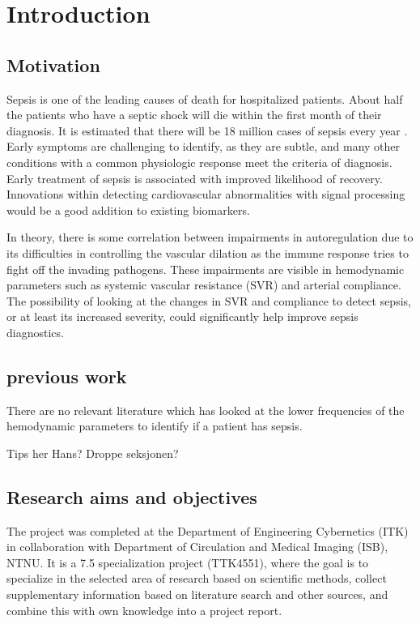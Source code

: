 
\chapter{Introduction}

\section{Motivation}
Sepsis is one of the leading causes of death for hospitalized patients. About half the patients who have a septic shock will die within the first month of their diagnosis.\cite{RN2} It is estimated that there will be 18 million cases of sepsis every year \cite{RN1}. Early symptoms are challenging to identify, as they are subtle, and many other conditions with a common physiologic response meet the criteria of diagnosis. Early treatment of sepsis is associated with improved likelihood of recovery. \cite{RN21} Innovations within detecting cardiovascular abnormalities with signal processing would be a good addition to existing biomarkers. 

In theory, there is some correlation between impairments in autoregulation due to its difficulties in controlling the vascular dilation as the immune response tries to fight off the invading pathogens. These impairments are visible in hemodynamic parameters such as systemic vascular resistance (SVR) and arterial compliance. The possibility of looking at the changes in SVR and compliance to detect sepsis, or at least its increased severity, could significantly help improve sepsis diagnostics.

\section{previous work}

There are no relevant literature which has looked at the lower frequencies of the hemodynamic parameters to identify if a patient has sepsis.

Tips her Hans? Droppe seksjonen?


\section{Research aims and objectives}
The project was completed at the Department of Engineering Cybernetics (ITK) in collaboration with Department of Circulation
and Medical Imaging (ISB), NTNU. It is a 7.5 specialization project (TTK4551), where the goal is to specialize in the selected area of research based on scientific methods, collect supplementary information based on literature search and other sources, and combine this with own knowledge into a project report.


